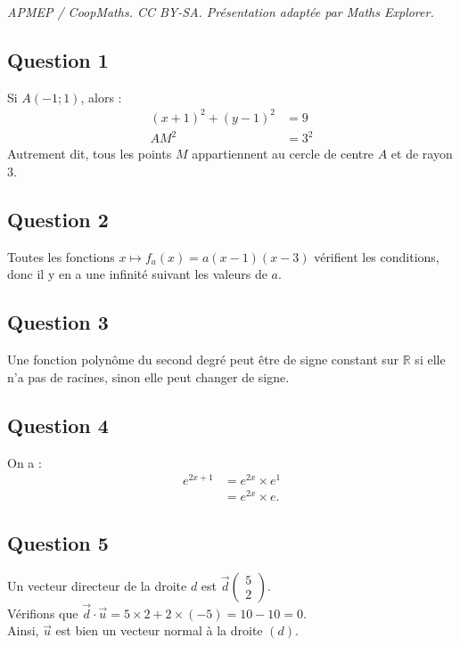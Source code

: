 \documentclass[10pt]{article}
\begin{document}
\noindent\textit{APMEP / CoopMaths. CC BY-SA. Présentation adaptée par Maths Explorer.}\par\medskip
\subsection*{Question 1}
	
	Si $A(-1 ; 1)$, alors :
	\begin{align*}
		(x+1)^2 + (y-1)^2 &= 9 \\
		AM^2 &= 3^2
	\end{align*}
	Autrement dit, tous les points $M$ appartiennent au cercle de centre $A$ et de rayon $3$.
	
	\subsection*{Question 2}
	
	Toutes les fonctions $x \mapsto f_a(x) = a(x -1)(x -3)$ vérifient les conditions, donc il y en a une infinité suivant les valeurs de $a$.
	
	\subsection*{Question 3}
	
	Une fonction polynôme du second degré peut être de signe constant sur $\mathbb{R}$ si elle n'a pas de racines, sinon elle peut changer de signe.
	
	\subsection*{Question 4}
	
	On a :
	\begin{align*}
		e^{2x+1} &= e^{2x} \times e^1 \\
		&= e^{2x} \times e.
	\end{align*}
	
	\subsection*{Question 5}
	
	Un vecteur directeur de la droite $d$ est $\overrightarrow{d}  \begin{pmatrix} 5 \\ 2 \end{pmatrix}$.\\
	Vérifions que $\overrightarrow{d} \cdot \overrightarrow{u} = 5 \times 2 + 2 \times (-5) = 10 - 10 = 0$.\\
	Ainsi, $\overrightarrow{u}$ est bien un vecteur normal à la droite $(d)$.
\end{document}
